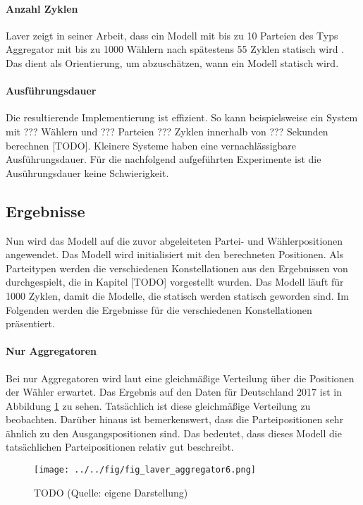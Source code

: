 \paragraph{Anzahl Zyklen}
Laver zeigt in seiner Arbeit, dass ein Modell mit bis zu 10 Parteien des Typs Aggregator mit bis zu 1000 Wählern nach spätestens 55 Zyklen statisch wird \citep[S.\,271-2]{laver2005policy}. Das dient als Orientierung, um abzuschätzen, wann ein Modell statisch wird.

\paragraph{Ausführungsdauer}
Die resultierende Implementierung ist effizient. So kann beispielsweise ein System mit ??? Wählern und ??? Parteien ??? Zyklen innerhalb von ??? Sekunden berechnen [TODO]. Kleinere Systeme haben eine vernachlässigbare Ausführungsdauer. Für die nachfolgend aufgeführten Experimente ist die Ausührungsdauer keine Schwierigkeit.

\subsection{Ergebnisse}

Nun wird das Modell auf die zuvor abgeleiteten Partei- und Wählerpositionen angewendet. Das Modell wird initialisiert mit den berechneten Positionen. Als Parteitypen werden die verschiedenen Konstellationen aus den Ergebnissen von \citet{laver2005policy} durchgespielt, die in Kapitel [TODO] vorgestellt wurden. Das Modell läuft für 1000 Zyklen, damit die Modelle, die statisch werden statisch geworden sind. Im Folgenden werden die Ergebnisse für die verschiedenen Konstellationen präsentiert.

\paragraph{Nur Aggregatoren}

Bei nur Aggregatoren wird laut \citet{laver2005policy} eine gleichmäßige Verteilung über die Positionen der Wähler erwartet. Das Ergebnis auf den Daten für Deutschland 2017 ist in Abbildung \ref{fig:laver-aggregator6} zu sehen. Tatsächlich ist diese gleichmäßige Verteilung zu beobachten. Darüber hinaus ist bemerkenswert, dass die Parteipositionen sehr ähnlich zu den Ausgangspositionen sind. Das bedeutet, dass dieses Modell die tatsächlichen Parteipositionen relativ gut beschreibt.

\begin{figure}[htb]
	\centering
	\texttt{[image: ../../fig/fig\_laver\_aggregator6.png]}
	\caption{TODO (Quelle: eigene Darstellung)}
	\label{fig:laver-aggregator6}
\end{figure}

